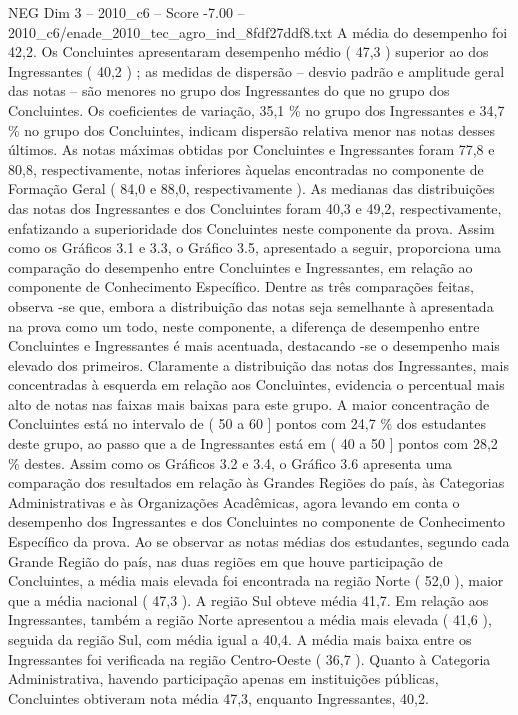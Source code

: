 \begin{textsample}{NEG Dim 3 – 2010\_c6 – Score -7.00 – 2010\_c6/enade\_2010\_tec\_agro\_ind\_8fdf27ddf8.txt}
A média do desempenho foi 42,2.
Os Concluintes apresentaram desempenho médio ( 47,3 ) superior ao dos Ingressantes ( 40,2 ) ; as medidas de dispersão – desvio padrão e amplitude geral das notas – são menores no grupo dos Ingressantes do que no grupo dos Concluintes.
Os coeficientes de variação, 35,1 \% no grupo dos Ingressantes e 34,7 \% no grupo dos Concluintes, indicam dispersão relativa menor nas notas desses últimos.
As notas máximas obtidas por Concluintes e Ingressantes foram 77,8 e 80,8, respectivamente, notas inferiores àquelas encontradas no componente de Formação Geral ( 84,0 e 88,0, respectivamente ).
As medianas das distribuições das notas dos Ingressantes e dos Concluintes foram 40,3 e 49,2, respectivamente, enfatizando a superioridade dos Concluintes neste componente da prova.
Assim como os Gráficos 3.1 e 3.3, o Gráfico 3.5, apresentado a seguir, proporciona uma comparação do desempenho entre Concluintes e Ingressantes, em relação ao componente de Conhecimento Específico.
Dentre as três comparações feitas, observa -se que, embora a distribuição das notas seja semelhante à apresentada na prova como um todo, neste componente, a diferença de desempenho entre Concluintes e Ingressantes é mais acentuada, destacando -se o desempenho mais elevado dos primeiros.
Claramente a distribuição das notas dos Ingressantes, mais concentradas à esquerda em relação aos Concluintes, evidencia o percentual mais alto de notas nas faixas mais baixas para este grupo.
A maior concentração de Concluintes está no intervalo de ( 50 a 60 ] pontos com 24,7 \% dos estudantes deste grupo, ao passo que a de Ingressantes está em ( 40 a 50 ] pontos com 28,2 \% destes.
Assim como os Gráficos 3.2 e 3.4, o Gráfico 3.6 apresenta uma comparação dos resultados em relação às Grandes Regiões do país, às Categorias Administrativas e às Organizações Acadêmicas, agora levando em conta o desempenho dos Ingressantes e dos Concluintes no componente de Conhecimento Específico da prova.
Ao se observar as notas médias dos estudantes, segundo cada Grande Região do país, nas duas regiões em que houve participação de Concluintes, a média mais elevada foi encontrada na região Norte ( 52,0 ), maior que a média nacional ( 47,3 ).
A região Sul obteve média 41,7.
Em relação aos Ingressantes, também a região Norte apresentou a média mais elevada ( 41,6 ), seguida da região Sul, com média igual a 40,4.
A média mais baixa entre os Ingressantes foi verificada na região Centro-Oeste ( 36,7 ).
Quanto à Categoria Administrativa, havendo participação apenas em instituições públicas, Concluintes obtiveram nota média 47,3, enquanto Ingressantes, 40,2.

\end{textsample}
